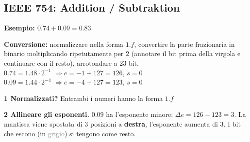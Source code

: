 \subsection{IEEE 754: Addition / Subtraktion}
\noindent\textbf{Esempio: $0.74 + 0.09 = 0.83$} 
\medskip

\noindent\textbf{Conversione:} normalizzare nella forma $1.f$, convertire la parte frazionaria in binario moltiplicando ripetutamente per $2$ (annotare il bit prima della virgola e continuare con il resto), arrotondare a 23 bit.\\
$0.74 = 1.48 \cdot 2^{-1}$ \quad $\Rightarrow e = -1+127 = 126$, $s = 0$\\
$0.09 = 1.44 \cdot 2^{-4}$ \quad $\Rightarrow e = -4+127 = 123$, $s = 0$
\smallskip


\bigskip

\noindent\textbf{1 Normalizzati?} Entrambi i numeri hanno la forma $1.f$ \checkmark\par\nobreak
\medskip

\noindent\textbf{2 Allineare gli esponenti.} $0.09$ ha l'esponente minore: 
$\Delta e = 126 - 123 = 3$. La mantissa viene spostata di 3 posizioni a \textbf{destra}, l'esponente aumenta di 3. I bit che escono (in \textcolor{gray}{grigio}) si tengono come resto.
\smallskip

\medskip

